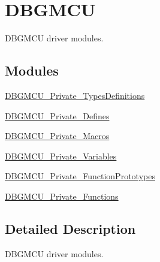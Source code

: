 \hypertarget{group___d_b_g_m_c_u}{\section{D\-B\-G\-M\-C\-U}
\label{group___d_b_g_m_c_u}
}


D\-B\-G\-M\-C\-U driver modules.  


\subsection*{Modules}
\begin{DoxyCompactItemize}
\item 
\hyperlink{group___d_b_g_m_c_u___private___types_definitions}{D\-B\-G\-M\-C\-U\-\_\-\-Private\-\_\-\-Types\-Definitions}
\item 
\hyperlink{group___d_b_g_m_c_u___private___defines}{D\-B\-G\-M\-C\-U\-\_\-\-Private\-\_\-\-Defines}
\item 
\hyperlink{group___d_b_g_m_c_u___private___macros}{D\-B\-G\-M\-C\-U\-\_\-\-Private\-\_\-\-Macros}
\item 
\hyperlink{group___d_b_g_m_c_u___private___variables}{D\-B\-G\-M\-C\-U\-\_\-\-Private\-\_\-\-Variables}
\item 
\hyperlink{group___d_b_g_m_c_u___private___function_prototypes}{D\-B\-G\-M\-C\-U\-\_\-\-Private\-\_\-\-Function\-Prototypes}
\item 
\hyperlink{group___d_b_g_m_c_u___private___functions}{D\-B\-G\-M\-C\-U\-\_\-\-Private\-\_\-\-Functions}
\end{DoxyCompactItemize}


\subsection{Detailed Description}
D\-B\-G\-M\-C\-U driver modules. 